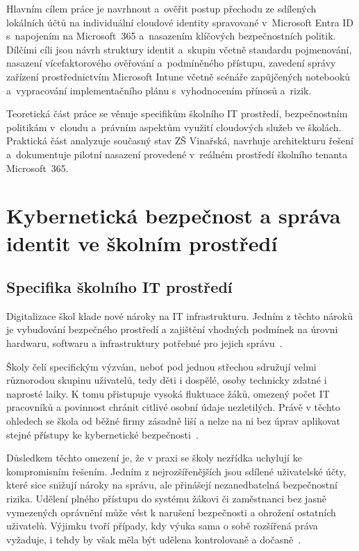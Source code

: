 \documentclass[male,czech,api_bc]{kitheses}
\begin{document}
Hlavním cílem práce je navrhnout a~ověřit postup přechodu ze sdílených 
lokálních účtů na individuální cloudové identity spravované v~Microsoft 
Entra ID s~napojením na Microsoft~365 a~nasazením klíčových bezpečnostních 
politik. Dílčími cíli jsou návrh struktury identit a~skupin včetně 
standardu pojmenování, nasazení vícefaktorového ověřování a~podmíněného 
přístupu, zavedení správy zařízení prostřednictvím Microsoft Intune 
včetně scénáře zapůjčených notebooků a~vypracování implementačního plánu 
s~vyhodnocením přínosů a~rizik.

Teoretická část práce se věnuje specifikům školního IT prostředí, 
bezpečnostním politikám v~cloudu a~právním aspektům využití cloudových 
služeb ve školách. Praktická část analyzuje současný stav ZŠ Vinařská, 
navrhuje architekturu řešení a~dokumentuje pilotní nasazení provedené 
v~reálném prostředí školního tenanta Microsoft~365.

\chapter{Kybernetická bezpečnost a správa identit ve školním prostředí}

\section{Specifika školního IT prostředí}
Digitalizace škol klade nové nároky na IT infrastrukturu. Jedním z těchto nároků je vybudování bezpečného prostředí a zajištění vhodných podmínek na úrovni hardwaru, softwaru a infrastruktury potřebné pro jejich správu~\cite{DigitalizaceCR2025}.

Školy čelí specifickým výzvám, neboť pod jednou střechou sdružují velmi různorodou skupinu uživatelů, tedy děti i dospělé, osoby technicky zdatné i naprosté laiky. K tomu přistupuje vysoká fluktuace žáků, omezený počet IT pracovníků a povinnost chránit citlivé osobní údaje nezletilých. Právě v těchto ohledech se škola od běžné firmy zásadně liší a nelze na ni bez úprav aplikovat stejné přístupy ke kybernetické bezpečnosti~\cite{Benes2024}.

Důsledkem těchto omezení je, že v praxi se školy nezřídka uchylují ke kompromisním řešením. Jedním z nejrozšířenějších jsou sdílené uživatelské účty, které sice snižují nároky na správu, ale přinášejí nezanedbatelná bezpečnostní rizika. Udělení plného přístupu do systému žákovi či zaměstnanci bez jasně vymezených oprávnění může vést k narušení bezpečnosti a ohrožení ostatních uživatelů. Výjimku tvoří případy, kdy výuka sama o sobě rozšířená práva vyžaduje, i tehdy by však měla být udělena kontrolovaně a dočasně~\cite{AFCEA2024}.
\end{document}
